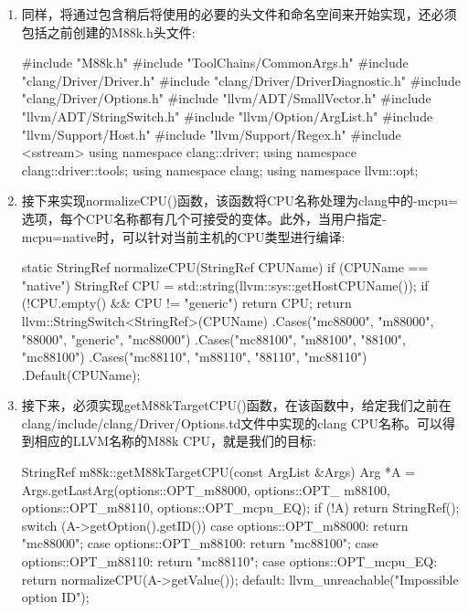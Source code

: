 \begin{enumerate}
\item
同样，将通过包含稍后将使用的必要的头文件和命名空间来开始实现，还必须包括之前创建的M88k.h头文件:

\begin{cpp}
#include "M88k.h"
#include "ToolChains/CommonArgs.h"
#include "clang/Driver/Driver.h"
#include "clang/Driver/DriverDiagnostic.h"
#include "clang/Driver/Options.h"
#include "llvm/ADT/SmallVector.h"
#include "llvm/ADT/StringSwitch.h"
#include "llvm/Option/ArgList.h"
#include "llvm/Support/Host.h"
#include "llvm/Support/Regex.h"
#include <sstream>
using namespace clang::driver;
using namespace clang::driver::tools;
using namespace clang;
using namespace llvm::opt;
\end{cpp}

\item
接下来实现normalizeCPU()函数，该函数将CPU名称处理为clang中的-mcpu=选项，每个CPU名称都有几个可接受的变体。此外，当用户指定-mcpu=native时，可以针对当前主机的CPU类型进行编译:

\begin{cpp}
static StringRef normalizeCPU(StringRef CPUName) {
    if (CPUName == "native") {
        StringRef CPU = std::string(llvm::sys::getHostCPUName());
        if (!CPU.empty() && CPU != "generic")
        return CPU;
    }
    return llvm::StringSwitch<StringRef>(CPUName)
    .Cases("mc88000", "m88000", "88000", "generic", "mc88000")
    .Cases("mc88100", "m88100", "88100", "mc88100")
    .Cases("mc88110", "m88110", "88110", "mc88110")
    .Default(CPUName);
}
\end{cpp}

\item
接下来，必须实现getM88kTargetCPU()函数，在该函数中，给定我们之前在clang/include/clang/Driver/Options.td文件中实现的clang CPU名称。可以得到相应的LLVM名称的M88k CPU，就是我们的目标:

\begin{cpp}
StringRef m88k::getM88kTargetCPU(const ArgList &Args) {
    Arg *A = Args.getLastArg(options::OPT_m88000, options::OPT_
        m88100, options::OPT_m88110, options::OPT_mcpu_EQ);
    if (!A)
        return StringRef();
    switch (A->getOption().getID()) {
    case options::OPT_m88000:
        return "mc88000";
    case options::OPT_m88100:
        return "mc88100";
    case options::OPT_m88110:
        return "mc88110";
    case options::OPT_mcpu_EQ:
        return normalizeCPU(A->getValue());
    default:
        llvm_unreachable("Impossible option ID");
    }
}
\end{cpp}


\end{enumerate}
